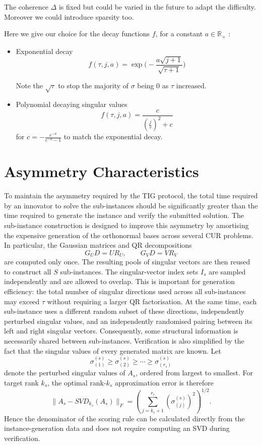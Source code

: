 \documentclass[12pt, legalpaper]{article}
\begin{document}
 The coherence $\Delta$ is fixed but could be varied in the future to adapt the difficulty. Moreover we could introduce sparsity too.

Here we give our choice for the decay functions $f$, for a constant $a\in \mathbb{R}_+$ :
\begin{itemize}
    \item Exponential decay
    \begin{equation}
   f(\tau,j,a)=\exp\Bigg(-\frac{a\sqrt{j+1}}{\sqrt{\tau+1}}\Bigg)
    \end{equation}

  Note the $\sqrt{\tau}$ to stop the majority of $\sigma$ being $0$ as $\tau$ increased.

\item
Polynomial decaying singular values
\begin{equation}
   f(\tau,j,a)=\frac{c}{\left(\frac{j}{\tau}\right)^{2}+c}
\end{equation}
for $c=-\frac{e^{-a}}{e^{-a}-1}$ to match the exponential decay.
\end{itemize}

\section{Asymmetry Characteristics}\label{sec:asymmetry} To maintain the asymmetry required by the TIG protocol, the total time required by an innovator to solve the sub-instances should be significantly greater than the time required to generate the instance and verify the submitted solution. The sub-instance construction is designed to improve this asymmetry by amortising the expensive generation of the orthonormal bases across several CUR problems. In particular, the Gaussian matrices and QR decompositions \[ G_UD=UR_U, \qquad G_VD=VR_V \] are computed only once. The resulting pools of singular vectors are then reused to construct all $S$ sub-instances. The singular-vector index sets $I_s$ are sampled independently and are allowed to overlap. This is important for generation efficiency: the total number of singular directions used across all sub-instances may exceed $\tau$ without requiring a larger QR factorisation. At the same time, each sub-instance uses a different random subset of these directions, independently perturbed singular values, and an independently randomised pairing between its left and right singular vectors. Consequently, some structural information is necessarily shared between sub-instances. Verification is also simplified by the fact that the singular values of every generated matrix are known. Let \[ \sigma^{(s)}_{(1)} \geq \sigma^{(s)}_{(2)} \geq \cdots \geq \sigma^{(s)}_{(r_s)} \] denote the perturbed singular values of $A_s$, ordered from largest to smallest. For target rank $k_s$, the optimal rank-$k_s$ approximation error is therefore \[ \|A_s-SVD_{k_s}(A_s)\|_F = \left( \sum_{j=k_s+1}^{r_s} \left(\sigma^{(s)}_{(j)}\right)^2 \right)^{1/2}. \] Hence the denominator of the scoring rule can be calculated directly from the instance-generation data and does not require computing an SVD during verification.
\end{document}
